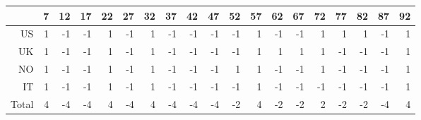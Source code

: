 \begin{table}[ht]
\centering
\begin{tabular}{rrrrrrrrrrrrrrrrrrr}
  \hline
 & 7 & 12 & 17 & 22 & 27 & 32 & 37 & 42 & 47 & 52 & 57 & 62 & 67 & 72 & 77 & 82 & 87 & 92 \\ 
  \hline
US & 1 & -1 & -1 & 1 & -1 & 1 & -1 & -1 & -1 & -1 & 1 & -1 & -1 & 1 & 1 & 1 & -1 & 1 \\ 
  UK & 1 & -1 & -1 & 1 & -1 & 1 & -1 & -1 & -1 & -1 & 1 & 1 & 1 & 1 & -1 & -1 & -1 & 1 \\ 
  NO & 1 & -1 & -1 & 1 & -1 & 1 & -1 & -1 & -1 & 1 & 1 & -1 & -1 & 1 & -1 & -1 & -1 & 1 \\ 
  IT & 1 & -1 & -1 & 1 & -1 & 1 & -1 & -1 & -1 & -1 & 1 & -1 & -1 & -1 & -1 & -1 & -1 & 1 \\ 
  Total & 4 & -4 & -4 & 4 & -4 & 4 & -4 & -4 & -4 & -2 & 4 & -2 & -2 & 2 & -2 & -2 & -4 & 4 \\ 
   \hline
\end{tabular}
\end{table}
